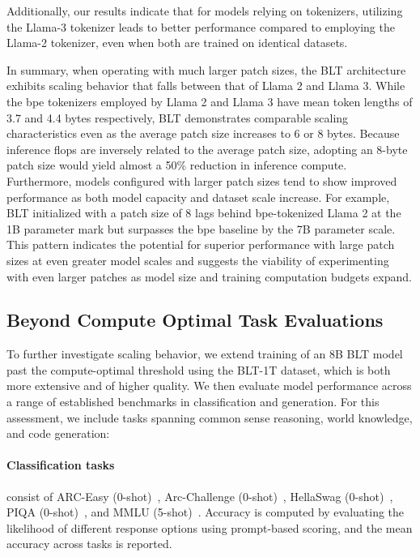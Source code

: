Additionally, our results indicate that for models relying on tokenizers, utilizing the Llama-3 tokenizer leads to better performance compared to employing the Llama-2 tokenizer, even when both are trained on identical datasets.

In summary, when operating with much larger patch sizes, the {\textsc BLT} architecture exhibits scaling behavior that falls between that of Llama 2 and Llama 3. While the bpe tokenizers employed by Llama 2 and Llama 3 have mean token lengths of 3.7 and 4.4 bytes respectively, {\textsc BLT} demonstrates comparable scaling characteristics even as the average patch size increases to 6 or 8 bytes. Because inference flops are inversely related to the average patch size, adopting an 8-byte patch size would yield almost a 50\% reduction in inference compute. Furthermore, models configured with larger patch sizes tend to show improved performance as both model capacity and dataset scale increase. For example, {\textsc BLT} initialized with a patch size of 8 lags behind bpe-tokenized Llama 2 at the 1B parameter mark but surpasses the bpe baseline by the 7B parameter scale. This pattern indicates the potential for superior performance with large patch sizes at even greater model scales and suggests the viability of experimenting with even larger patches as model size and training computation budgets expand.

\subsection{Beyond Compute Optimal Task Evaluations}
\label{section:evals}
To further investigate scaling behavior, we extend training of an 8B {\textsc BLT} model past the compute-optimal threshold using the {\textsc BLT}-1T dataset, which is both more extensive and of higher quality. We then evaluate model performance across a range of established benchmarks in classification and generation. For this assessment, we include tasks spanning common sense reasoning, world knowledge, and code generation:

\paragraph{Classification tasks} consist of ARC-Easy (0-shot)~\citep{Eval_ARC}, Arc-Challenge (0-shot)~\citep{Eval_ARC}, HellaSwag (0-shot)~\citep{Eval_hellaswag}, PIQA (0-shot)~\citep{Eval_piqa}, and MMLU (5-shot)~\citep{hendrycks2020measuring}. Accuracy is computed by evaluating the likelihood of different response options using prompt-based scoring, and the mean accuracy across tasks is reported.

